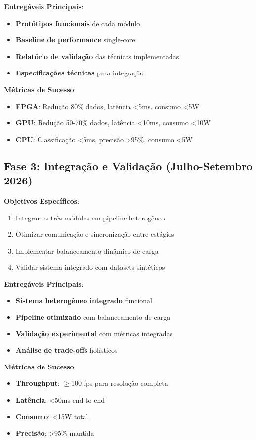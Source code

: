 \textbf{Entregáveis Principais}:
\begin{itemize}
    \item \textbf{Protótipos funcionais} de cada módulo
    \item \textbf{Baseline de performance} single-core
    \item \textbf{Relatório de validação} das técnicas implementadas
    \item \textbf{Especificações técnicas} para integração
\end{itemize}

\textbf{Métricas de Sucesso}:
\begin{itemize}
    \item \textbf{FPGA}: Redução 80\% dados, latência <5ms, consumo <5W
    \item \textbf{GPU}: Redução 50-70\% dados, latência <10ms, consumo <10W
    \item \textbf{CPU}: Classificação <5ms, precisão >95\%, consumo <5W
\end{itemize}

\subsection{Fase 3: Integração e Validação (Julho-Setembro 2026)}\label{subsec:fase3_integracao_cronograma}

\textbf{Objetivos Específicos}:
\begin{enumerate}
    \item Integrar os três módulos em pipeline heterogêneo
    \item Otimizar comunicação e sincronização entre estágios
    \item Implementar balanceamento dinâmico de carga
    \item Validar sistema integrado com datasets sintéticos
\end{enumerate}

\textbf{Entregáveis Principais}:
\begin{itemize}
    \item \textbf{Sistema heterogêneo integrado} funcional
    \item \textbf{Pipeline otimizado} com balanceamento de carga
    \item \textbf{Validação experimental} com métricas integradas
    \item \textbf{Análise de trade-offs} holísticos
\end{itemize}

\textbf{Métricas de Sucesso}:
\begin{itemize}
    \item \textbf{Throughput}: $\geq$100 fps para resolução completa
    \item \textbf{Latência}: <50ms end-to-end
    \item \textbf{Consumo}: <15W total
    \item \textbf{Precisão}: >95\% mantida
\end{itemize}

